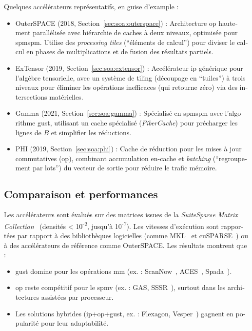 \begin{otherlanguage}{french}
Quelques accélérateurs représentatifs, en guise d'example :
\begin{itemize}
    \item OuterSPACE (2018, Section~\ref{sec:soa:outerspace}) : Architecture \acrshort{op} hautement parallélisée avec hiérarchie de caches à deux niveaux, optimisée pour \acrshort{spmspm}.
    Utilise des \textit{processing tiles} (``éléments de calcul'') pour diviser le calcul en phases de multiplications et de fusion des résultats partiels.
    \item ExTensor (2019, Section~\ref{sec:soa:extensor}) : Accélérateur \acrshort{ip} générique pour l'algèbre tensorielle, avec un système de \gls{tiling} (découpage en ``tuiles'') à trois niveaux pour éliminer les opérations inefficaces (qui retourne zéro) via des intersections matérielles.
    \item Gamma (2021, Section~\ref{sec:soa:gamma}) : Spécialisé en \acrshort{spmspm} avec l'algorithme \acrshort{gust}, utilisant un cache spécialisé (\textit{FiberCache}) pour précharger les lignes de $B$ et simplifier les réductions.
    \item PHI (2019, Section~\ref{sec:soa:phi}) : Cache de réduction pour les mises à jour commutatives (\acrshort{op}), combinant accumulation en-cache et \textit{batching} (``regroupement par lots'') du vecteur de sortie pour réduire le trafic mémoire.
\end{itemize}

\subsection*{Comparaison et performances}

Les accélérateurs sont évalués sur des matrices issues de la \textit{SuiteSparse Matrix Collection}~\cite{Kolodziej2019_SuiteSparse} (densités < 10\textsuperscript{-2}, jusqu'à 10\textsuperscript{-7}).
Les vitesses d'exécution sont rapportées par rapport à des bibliothèques logicielles (comme MKL~\cite{Intel2003_IntelMKL} et cuSPARSE~\cite{NVIDIA2014_cuSPARSE}) ou à des accélérateurs de référence comme OuterSPACE.
Les résultats montrent que :
\begin{itemize}
    \item \acrlong{gust} domine pour les opérations \acrshort{mm} (ex. : ScanNow~\cite{Ma2025_ScanNow}, ACES~\cite{Lu2024_ACES}, Spada~\cite{Li2023_Spada}).
    \item \acrshort{op} reste compétitif pour le \acrshort{spmv} (ex. : GAS, SSSR~\cite{Scheffler2023_SSSR}), surtout dans les architectures assistées par processeur.
    \item Les solutions hybrides (\acrshort{ip}+\acrshort{op}+\acrshort{gust}, ex. : Flexagon, Vesper~\cite{Jin2024_Vesper}) gagnent en popularité pour leur adaptabilité.
\end{itemize}


\end{otherlanguage}
